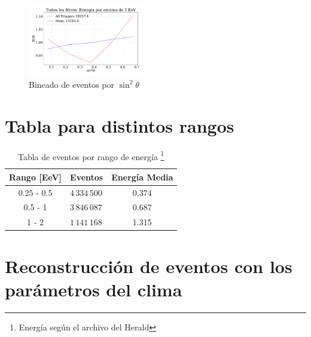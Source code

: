 \begin{figure}[H]
    \begin{small}
        \begin{center}
            \includegraphics[width=0.45\textwidth]{eventos_bin_sin_theta.pdf}
        \end{center}
        \caption{Bineado de eventos por $\sin^2\theta$}
        \label{fig:Bineado}
    \end{small}
\end{figure}


\section*{Tabla para distintos rangos}
\begin{table}[H]
    \begin{small}
        \begin{center}
            \begin{tabular}[c]{c|l|c}
                \multicolumn{1}{c|}{\textbf{Rango [EeV]}} & 
                \multicolumn{1}{c|}{\textbf{Eventos}} 
                & \bf{Energía Media} \\
                \hline
                0.25 - 0.5 & $4\,334\,500$ & 0.374\\
                0.5 - 1 &   $3\,846\,087$ & 0.687\\
                1   - 2 & $1\,141\,168$ & 1.315 \\
            \end{tabular}
            \caption{Tabla de eventos por rango de energía \footnote{Energía según el archivo del Herald}}
            \label{tab:}
        \end{center}
    \end{small}
\end{table}

\section*{Reconstrucción de eventos con los parámetros del clima}


